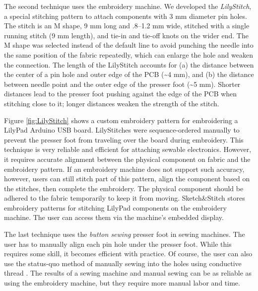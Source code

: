 \documentclass[header.tex]{subfiles}
\begin{document}
The second technique uses the embroidery machine. We developed the \textit{LilyStitch}, a special stitching pattern to attach components with 3 mm diameter pin holes. The stitch is an M shape, 9 mm long and .8--1.2 mm wide, stitched with a single running stitch (9 mm length), and tie-in and tie-off knots on the wider end. The M shape was selected instead of the default line to avoid punching the needle into the same position of the fabric repeatedly, which can enlarge the hole and weaken the connection. 
The length of the LilyStitch accounts for (a) the distance between the center of a pin hole and outer edge of the PCB (\textasciitilde 4 mm), and (b) the distance between needle point and the outer edge of the presser foot (\textasciitilde 5 mm). Shorter distances lead to the presser foot pushing against the edge of the PCB when stitching close to it; longer distances weaken the strength of the stitch.

Figure \ref{fig:LilyStitch} shows a custom embroidery pattern for embroidering a LilyPad Arduino USB board. LilyStitches were sequence-ordered manually to prevent the presser foot from traveling over the board during embroidery. This technique is very reliable and efficient for attaching sewable electronics. However, it requires accurate alignment between the physical component on fabric and the embroidery pattern. If an embroidery machine does not support such accuracy, however, users can still stitch part of this pattern, align the component based on the stitches, then complete the embroidery. The physical component should be adhered to the fabric temporarily to keep it from moving. Sketch\&Stitch stores embroidery patterns for stitching LilyPad components on the embroidery machine. The user can access them via the machine's embedded display.

The last technique uses the \textit{button sewing} presser foot in sewing machines. The user has to manually align each pin hole under the presser foot. While this requires some skill, it becomes efficient with practice. Of course, the user can also use the status-quo method of manually sewing into the holes using conductive thread \cite{Buechley:2008:LAU:1357054.1357123}. 
The results of a sewing machine and manual sewing can be as reliable as using the embroidery machine, but they require more manual labor and time.
\end{document}
